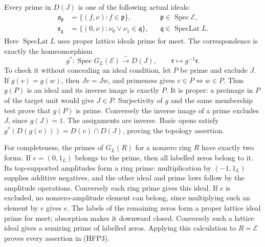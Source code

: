 Every prime in $D(J)$ is one of the following actual ideals:
\begin{equation}\tag{HFP3}
\begin{aligned}
 \mathfrak a_{\mathfrak p}
   &=\{(f,\nu):f\in\mathfrak p\},
       &&\mathfrak p\in\operatorname{Spec}\mathcal E,\\
 \mathfrak s_{\mathfrak q}
   &=\{(0,\nu):\nu_0\vee\nu_1\in\mathfrak q\},
       &&\mathfrak q\in\operatorname{SpecLat}L.
\end{aligned}
\end{equation}
Here $\operatorname{SpecLat}L$ uses proper lattice ideals prime for
meet. The correspondence is exactly the homeomorphism
\begin{equation}\tag{HFP4}
 g^*:\operatorname{Spec}G_L(\mathcal E)\xrightarrow{\sim}D(J),
 \qquad \mathfrak r\longmapsto g^{-1}\mathfrak r.
\end{equation}
To check it without concealing an ideal condition, let $P$ be prime
and exclude $J$. If $g(v)=g(w)$, then $Jv=Jw$, and primeness gives
$v\in P\Longleftrightarrow w\in P$. Thus $g(P)$ is an ideal and
its inverse image is exactly $P$. It is proper: a preimage in $P$
of the target unit would give $J\in P$. Surjectivity of $g$ and
the same membership test prove that $g(P)$ is prime. Conversely
the inverse image of a prime excludes $J$, since $g(J)=1$.
The assignments are inverse. Basic opens satisfy
$g^*(D(g(v)))=D(v)\cap D(J)$, proving the topology assertion.

For completeness, the primes of $G_L(R)$ for a nonzero ring $R$
have exactly two forms. If $e=(0,1_L)$ belongs to the prime, then
all labelled zeros belong to it. Its top-supported amplitudes form
a ring prime: multiplication by $(-1,1_L)$ supplies additive
negatives, and the other ideal and prime laws follow by the
amplitude operations. Conversely each ring prime gives this ideal.
If $e$ is excluded, no nonzero-amplitude element can belong, since
multiplying such an element by $e$ gives $e$. The labels of the
remaining zeros form a proper lattice ideal prime for meet; absorption
makes it downward closed. Conversely such a lattice ideal gives
a semiring prime of labelled zeros. Applying this calculation to
$R=\mathcal E$ proves every assertion in (HFP3).

